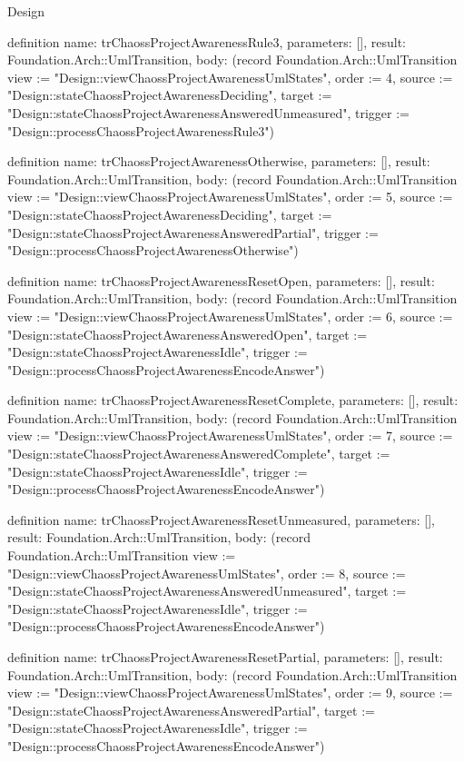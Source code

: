 \begin{lexlean}{Design}
\begin{semanticmodule}
definition{
  name: trChaossProjectAwarenessRule3,
  parameters: [],
  result: Foundation.Arch::UmlTransition,
  body: (record Foundation.Arch::UmlTransition {view := "Design::viewChaossProjectAwarenessUmlStates", order := 4, source := "Design::stateChaossProjectAwarenessDeciding", target := "Design::stateChaossProjectAwarenessAnsweredUnmeasured", trigger := "Design::processChaossProjectAwarenessRule3"})
}

definition{
  name: trChaossProjectAwarenessOtherwise,
  parameters: [],
  result: Foundation.Arch::UmlTransition,
  body: (record Foundation.Arch::UmlTransition {view := "Design::viewChaossProjectAwarenessUmlStates", order := 5, source := "Design::stateChaossProjectAwarenessDeciding", target := "Design::stateChaossProjectAwarenessAnsweredPartial", trigger := "Design::processChaossProjectAwarenessOtherwise"})
}

definition{
  name: trChaossProjectAwarenessResetOpen,
  parameters: [],
  result: Foundation.Arch::UmlTransition,
  body: (record Foundation.Arch::UmlTransition {view := "Design::viewChaossProjectAwarenessUmlStates", order := 6, source := "Design::stateChaossProjectAwarenessAnsweredOpen", target := "Design::stateChaossProjectAwarenessIdle", trigger := "Design::processChaossProjectAwarenessEncodeAnswer"})
}

definition{
  name: trChaossProjectAwarenessResetComplete,
  parameters: [],
  result: Foundation.Arch::UmlTransition,
  body: (record Foundation.Arch::UmlTransition {view := "Design::viewChaossProjectAwarenessUmlStates", order := 7, source := "Design::stateChaossProjectAwarenessAnsweredComplete", target := "Design::stateChaossProjectAwarenessIdle", trigger := "Design::processChaossProjectAwarenessEncodeAnswer"})
}

definition{
  name: trChaossProjectAwarenessResetUnmeasured,
  parameters: [],
  result: Foundation.Arch::UmlTransition,
  body: (record Foundation.Arch::UmlTransition {view := "Design::viewChaossProjectAwarenessUmlStates", order := 8, source := "Design::stateChaossProjectAwarenessAnsweredUnmeasured", target := "Design::stateChaossProjectAwarenessIdle", trigger := "Design::processChaossProjectAwarenessEncodeAnswer"})
}

definition{
  name: trChaossProjectAwarenessResetPartial,
  parameters: [],
  result: Foundation.Arch::UmlTransition,
  body: (record Foundation.Arch::UmlTransition {view := "Design::viewChaossProjectAwarenessUmlStates", order := 9, source := "Design::stateChaossProjectAwarenessAnsweredPartial", target := "Design::stateChaossProjectAwarenessIdle", trigger := "Design::processChaossProjectAwarenessEncodeAnswer"})
}


\end{semanticmodule}
\end{lexlean}
